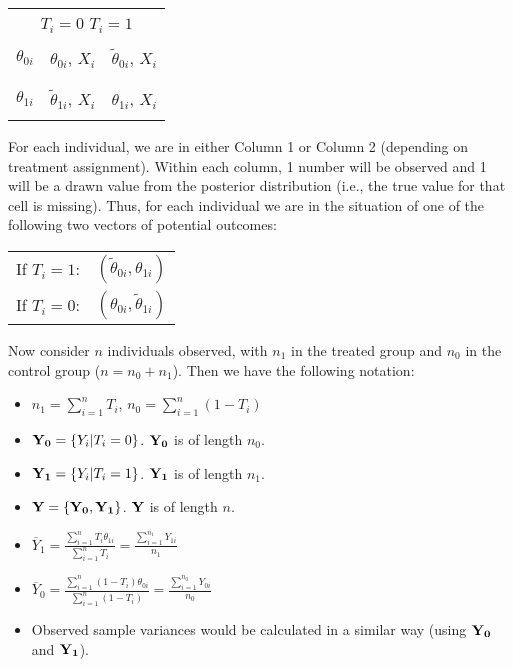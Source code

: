 \documentclass[oneside,letterpaper,titlepage,12pt]{article}
\begin{document}
\begin{center}
\begin{tabular}{c|c|c|}
\multicolumn{3}{c}{\hspace*{.8cm} $T_i=0$ \hfill $T_i=1$} \\
\cline{2-3}
& \phantom{abcd} \\
$\theta_{0i}$ & $\theta_{0i}$, $X_i$ & $\tilde{\theta}_{0i}$, $X_i$ \\
& \phantom{abcd} \\
\cline{2-3}
& \phantom{abcd} \\
$\theta_{1i}$ & $\tilde{\theta}_{1i}$, $X_i$ & $\theta_{1i}$, $X_i$ \\
& \phantom{abcd} \\
\cline{2-3}
\end{tabular}
\end{center}
 
For each individual, we are in either Column 1 or Column 2 (depending on treatment assignment).  Within each column, 1 number will be observed and 1 will be a drawn
value from the posterior distribution (i.e., the true value for that cell is missing). Thus, for each individual we are in the situation of one of the 
following two vectors of potential outcomes:

\begin{center}
\begin{tabular}{rl}
If $T_i=1$: & $(\tilde\theta_{0i}, \theta_{1i})$ \\
If $T_i=0$: & $(\theta_{0i}, \tilde\theta_{1i})$ \\
\end{tabular}
\end{center}

Now consider $n$ individuals observed, with $n_1$ in the treated group and $n_0$ in the control group ($n=n_0+n_1$).  Then we have the following notation:
\begin{itemize}
\item $n_1=\sum_{i=1}^n T_i$, $n_0=\sum_{i=1}^n (1-T_i)$
\item ${\bf Y_0} = \{Y_{i}|T_i=0\}$.  ${\bf Y_0}$ is of length $n_0$.
\item ${\bf Y_1} = \{Y_{i}|T_i=1\}$.  ${\bf Y_1}$ is of length $n_1$.
\item ${\bf Y} = \{ {\bf Y_0}, {\bf Y_1}\}$.  ${\bf Y}$ is of length $n$.
\item $\overline{Y}_1 = \frac{\sum_{i=1}^n T_i \theta_{1i}}{\sum_{i=1}^n T_i}=\frac{\sum_{i=1}^{n_1} Y_{1i}}{n_1}$
\item $\overline{Y}_0 = \frac{\sum_{i=1}^n (1-T_i) \theta_{0i}}{\sum_{i=1}^n (1-T_i)}=\frac{\sum_{i=1}^{n_0} Y_{0i}}{n_0}$
\item Observed sample variances would be calculated in a similar way (using ${\bf Y_0}$ and ${\bf Y_1}$).
\end{itemize}
\end{document}
